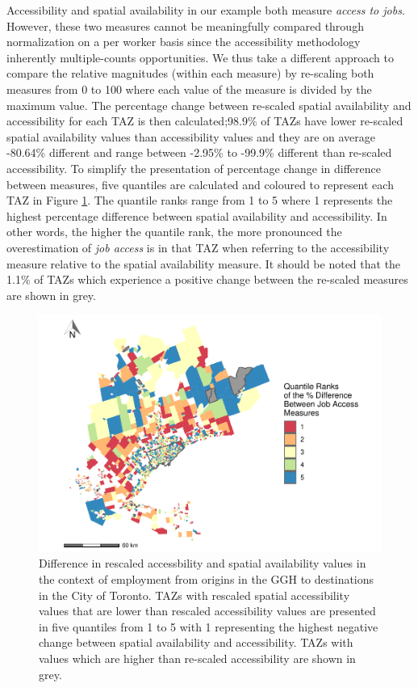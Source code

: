 \documentclass[]{elsarticle} %
\begin{document}
Accessibility and spatial availability in our example both measure
\emph{access to jobs}. However, these two measures cannot be
meaningfully compared through normalization on a per worker basis since
the accessibility methodology inherently multiple-counts opportunities.
We thus take a different approach to compare the relative magnitudes
(within each measure) by re-scaling both measures from 0 to 100 where
each value of the measure is divided by the maximum value. The
percentage change between re-scaled spatial availability and
accessibility for each TAZ is then calculated;98.9\% of TAZs have lower
re-scaled spatial availability values than accessibility values and they
are on average -80.64\% different and range between -2.95\% to -99.9\%
different than re-scaled accessibility. To simplify the presentation of
percentage change in difference between measures, five quantiles are
calculated and coloured to represent each TAZ in Figure
\ref{fig:indexed-measures-comparison-plot}. The quantile ranks range
from 1 to 5 where 1 represents the highest percentage difference between
spatial availability and accessibility. In other words, the higher the
quantile rank, the more pronounced the overestimation of \emph{job
access} is in that TAZ when referring to the accessibility measure
relative to the spatial availability measure. It should be noted that
the 1.1\% of TAZs which experience a positive change between the
re-scaled measures are shown in grey.

\begin{figure}
\includegraphics[width=1\linewidth]{Spatial-Availability_files/figure-latex/indexed-measures-comparison-plot-1} \caption{\label{fig:indexed-measures-comparison-plot}Difference in rescaled accessbility and spatial availability values in the context of employment from origins in the GGH to destinations in the City of Toronto. TAZs with rescaled spatial accessibility values that are lower than rescaled accessibility values are presented in five quantiles from 1 to 5 with 1 representing the highest negative change between spatial availability and accessibility. TAZs with values which are higher than re-scaled accessibility are shown in grey.}\label{fig:indexed-measures-comparison-plot}
\end{figure}
\end{document}
